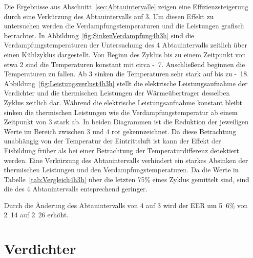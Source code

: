Die Ergebnisse aus Abschnitt~\ref{sec:Abtauintervalle} zeigen eine Effizienzsteigerung durch eine Verkürzung des Abtauintervalls auf \unit{3}{\hour}. Um diesen Effekt zu untersuchen werden die Verdampfungstemperaturen und die Leistungen grafisch betrachtet.
In Abbildung~\ref{fig:SinkenVerdampfung4h3h} sind die Verdampfungstemperaturen der Untersuchung des \unit{4}{\hour} Abtauintervalls zeitlich über einen Kühlzyklus dargestellt. Von Beginn des Zyklus bis zu einem Zeitpunkt von etwa \unit{2}{\hour} sind die Temperaturen konstant mit circa \unit{-7}{\celsius}. Anschließend beginnen die Temperaturen zu fallen. Ab \unit{3}{\hour} sinken die Temperaturen sehr stark auf bis zu \unit{-18}{\celsius}.
Abbildung~\ref{fig:Leistungsverlust4h3h} stellt die elektrische Leistungsaufnahme der Verdichter und die thermischen Leistungen der Wärmeübertrager desselben Zyklus zeitlich dar. Während die elektrische Leistungsaufnahme konstant bleibt sinken die thermischen Leistungen wie die Verdampfungstemperatur ab einem Zeitpunkt von \unit{3}{\hour} stark ab. In beiden Diagrammen ist die Reduktion der jeweiligen Werte im Bereich zwischen \unit{3}{\hour} und \unit{4}{\hour} rot gekennzeichnet. \newline
Da diese Betrachtung unabhängig von der Temperatur der Eintrittsluft ist kann der Effekt der Eisbildung früher als bei einer Betrachtung der Temperaturdifferenz detektiert werden. Eine Verkürzung des Abtauintervalls verhindert ein starkes Absinken der thermischen Leistungen und den Verdampfungstemperaturen. Da die Werte in Tabelle~\ref{tab:Vergleich4h3h} über die letzten \unit{75}{\%} eines Zyklus gemittelt sind, sind die des \unit{4}{\hour} Abtauintervalls entsprechend geringer.

Durch die Änderung des Abtauintervalls von \unit{4}{\hour} auf \unit{3}{\hour} wird der EER um \unit{5.6}{\%} von \unit{2.14}{} auf \unit{2.26}{} erhöht.















\section{Verdichter}
\label{sec:Verdichter}

